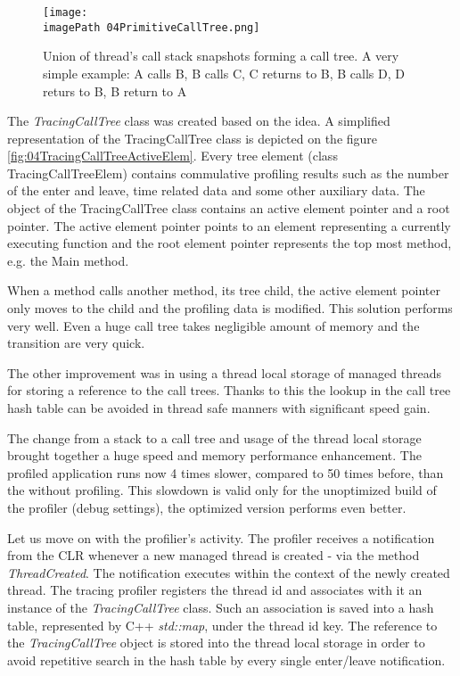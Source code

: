 \begin{figure}
	\centering
		\texttt{[image: \\imagePath 04PrimitiveCallTree.png]}
		\caption{Union of thread's call stack snapshots forming a call tree. A very simple example: A calls  B, B calls C, C returns to B, B calls D, D returs to B, B return to A }
	\label{fig:04PrimitiveCallTree}
\end{figure}

The \textit{TracingCallTree} class was created based on the idea.
A simplified representation of the TracingCallTree class is depicted on the figure \ref{fig:04TracingCallTreeActiveElem}. Every tree element (class TracingCallTreeElem) contains commulative profiling results such as the number of the enter and leave, time related data and some other auxiliary data. The object of the TracingCallTree class contains an active element pointer and a root pointer. The active element pointer points to an element representing a currently executing function and the root element pointer represents the top most method, e.g. the Main method. 

When a method calls another method, its tree child, the active element pointer only moves to the child and the profiling data is modified. This solution performs very well. Even a huge call tree takes negligible amount of memory and the transition are very quick. 

The other improvement was in using a thread local storage of managed threads for storing a reference to the call trees. Thanks to this the lookup in the call tree hash table can be avoided in thread safe manners with significant speed gain. 

The change from a stack to a call tree and usage of the thread local storage brought together a huge speed and memory performance enhancement. The profiled application runs now 4 times slower, compared to 50 times before, than the without profiling. This slowdown is valid only for the unoptimized build of the profiler (debug settings), the optimized version performs even better. 

Let us move on with the profilier's activity. The profiler receives a notification from the CLR whenever a new managed thread is created - via the method \textit{ThreadCreated}. The notification executes within the context of the newly created thread. The tracing profiler registers the thread id and associates with it an instance of the \textit{TracingCallTree} class. Such an association is saved into a hash table, represented by C++ \textit{std::map}, under the thread id key. The reference to the \textit{TracingCallTree} object is stored into the thread local storage in order to avoid repetitive search in the hash table by every single enter/leave notification.

